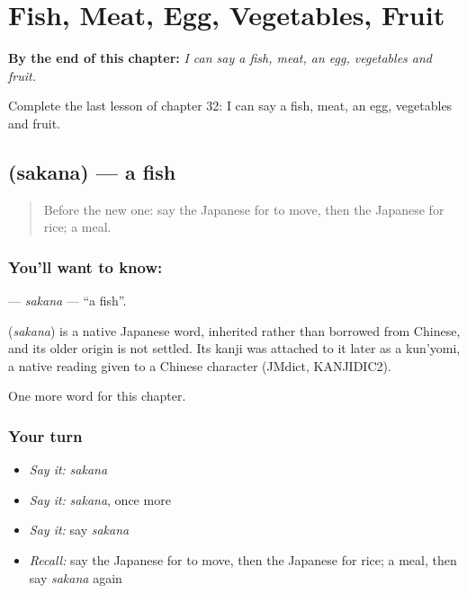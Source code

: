 
\chapter{Fish, Meat, Egg, Vegetables, Fruit}
\label{ch:ja-fish-meat-egg-vegetables-fruit}

\begin{chapteropening}
\textbf{By the end of this chapter:} \emph{I can say a fish, meat, an egg, vegetables and fruit.}

Complete the last lesson of chapter 32: I can say a fish, meat, an egg, vegetables and fruit.
\end{chapteropening}

\section[\texorpdfstring{\ja{さかな} (sakana)}{さかな (sakana)}]{ (sakana) — a fish}

\label{lesson:JA-C32-sakana}



\begin{quote}
Before the new one: say the Japanese for to move, then the Japanese for rice; a meal.
\end{quote}

\subsection*{You'll want to know: }
\textbf{} — \emph{sakana} — \textquotedblleft{}a fish\textquotedblright{}.

\begin{cousinweb}
\textbf{} (\emph{sakana}) is a native Japanese word, inherited rather than borrowed from Chinese, and its older origin is not settled. Its kanji was attached to it later as a kun'yomi, a native reading given to a Chinese character (JMdict, KANJIDIC2).
\end{cousinweb}

\begin{grammarlens}[title={What you've built}]
One more word for this chapter.
\end{grammarlens}

\subsection*{Your turn}
\begin{itemize}
\raggedright
  \item \emph{Say it:} \emph{sakana}
  \item \emph{Say it:} \emph{sakana}, once more
  \item \emph{Say it:} say \emph{sakana}
  \item \emph{Recall:} say the Japanese for to move, then the Japanese for rice; a meal, then say \emph{sakana} again
\end{itemize}

